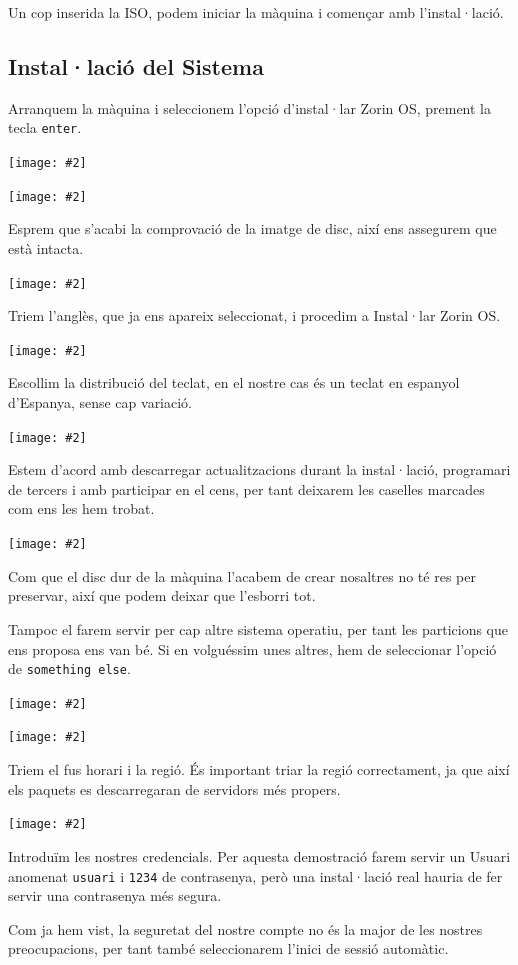 \documentclass[a4paper,12pt]{article}
\newcommand{\mygraphic}[2][width=0.9\textwidth]{\begin{center}
		\centering\texttt{[image: \#2]}\par
\end{center}}
\begin{document}
Un cop inserida la ISO, podem iniciar la màquina i començar amb l'instal·lació.

\newpage
\subsection{Instal·lació del Sistema}

Arranquem la màquina i seleccionem l'opció d'instal·lar Zorin OS, prement la tecla \texttt{enter}.
\mygraphic{imatges/a12.png}
\mygraphic[height=0.45\textheight]{imatges/a13.png}

\newpage
Esprem que s'acabi la comprovació de la imatge de disc, així ens assegurem que està intacta.
\mygraphic[height=0.44\textheight]{imatges/a14.png}

Triem l'anglès, que ja ens apareix seleccionat, i procedim a Instal·lar Zorin OS.
\mygraphic[height=0.44\textheight]{imatges/a15.png}

Escollim la distribució del teclat, en el nostre cas és un teclat en espanyol d'Espanya, sense cap variació.
\mygraphic[height=0.4\textheight]{imatges/a16.png}

Estem d'acord amb descarregar actualitzacions durant la instal·lació, programari de tercers i amb participar en el cens, per tant deixarem les caselles marcades com ens les hem trobat.
\mygraphic[height=0.4\textheight]{imatges/a17.png}

Com que el disc dur de la màquina l'acabem de crear nosaltres no té res per preservar, així que podem deixar que l'esborri tot.

Tampoc el farem servir per cap altre sistema operatiu, per tant les particions que ens proposa ens van bé.
Si en volguéssim unes altres, hem de seleccionar l'opció de \texttt{something else}.
\mygraphic[height=0.45\textheight]{imatges/a18.png}
\mygraphic[height=0.45\textheight]{imatges/a19.png}

Triem el fus horari i la regió. És important triar la regió correctament, ja que així els paquets es descarregaran de servidors més propers.
\mygraphic[height=0.45\textheight]{imatges/a20.png}

Introduïm les nostres credencials. Per aquesta demostració farem servir un Usuari anomenat \texttt{usuari} i \texttt{1234} de contrasenya, però una instal·lació real hauria de fer servir una contrasenya més segura.

Com ja hem vist, la seguretat del nostre compte no és la major de les nostres preocupacions, per tant també seleccionarem l'inici de sessió automàtic.
\end{document}
